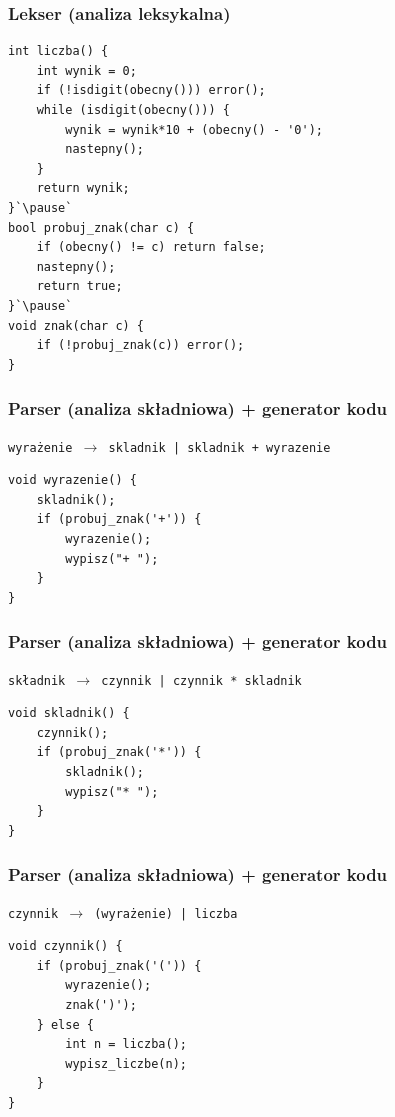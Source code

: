 \documentclass{beamer}
\begin{document}
	\begin{frame}[fragile]
		\frametitle{Lekser (analiza leksykalna)}
		\lstset{language=[my]C}
		\begin{lstlisting}
int liczba() {
	int wynik = 0;
	if (!isdigit(obecny())) error();
	while (isdigit(obecny())) {
		wynik = wynik*10 + (obecny() - '0');
		nastepny();
	}
	return wynik;
}`\pause`
bool probuj_znak(char c) {
	if (obecny() != c) return false;
	nastepny();
	return true;
}`\pause`
void znak(char c) {
	if (!probuj_znak(c)) error();
}
		\end{lstlisting}
	\end{frame}
	
	\begin{frame}[fragile]
		\frametitle{Parser (analiza składniowa) + generator kodu}
		\texttt{wyrażenie $\rightarrow$ skladnik | skladnik + wyrazenie}\newline
		\lstset{language=[my]C}
		\lstset{frame=tb}
		\begin{lstlisting}
void wyrazenie() {
	skladnik();
	if (probuj_znak('+')) {
		wyrazenie();
		wypisz("+ ");
	}
}
		\end{lstlisting}
	\end{frame}

	\begin{frame}[fragile]
		\frametitle{Parser (analiza składniowa) + generator kodu}
		\texttt{składnik $\rightarrow$ czynnik | czynnik * skladnik} \newline
		\lstset{language=[my]C}
		\lstset{frame=tb}
		\begin{lstlisting}
void skladnik() {
	czynnik();
	if (probuj_znak('*')) {
		skladnik();
		wypisz("* ");
	}
}
		\end{lstlisting}
	\end{frame}

	\begin{frame}[fragile]
		\frametitle{Parser (analiza składniowa) + generator kodu}
		\texttt{czynnik $\rightarrow$ (wyrażenie) | liczba}
		\lstset{language=[my]C}
		\lstset{frame=tb}
		\begin{lstlisting}
void czynnik() {
	if (probuj_znak('(')) {
		wyrazenie();
		znak(')');
	} else {
		int n = liczba();
		wypisz_liczbe(n);
	}
}
		\end{lstlisting}
	\end{frame}
	
\end{document}
